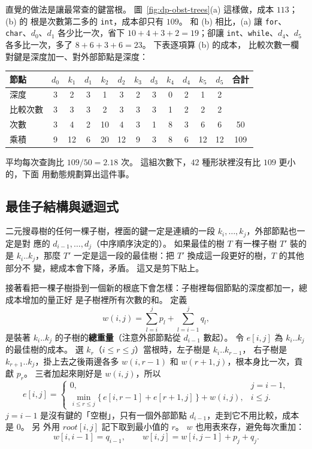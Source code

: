 直覺的做法是讓最常查的鍵當根。 圖~\ref{fig:dp-obst-trees}(a) 這樣做，成本 $113$；(b) 的
根是次數第二多的 \texttt{int}，成本卻只有 $109$。 和 (b) 相比，(a) 讓 \texttt{for}、\texttt{char}、$d_0$、$d_1$ 各少比一次，省下
$10 + 4 + 3 + 2 = 19$；卻讓 \texttt{int}、\texttt{while}、$d_4$、$d_5$ 各多比一次，多了
$8 + 6 + 3 + 6 = 23$。 下表逐項算 (b) 的成本，
比較次數一欄對鍵是深度加一、對外部節點是深度：

\begin{center}
\begin{tabular}{l*{11}{c}c}
\toprule
節點 & $d_0$ & $k_1$ & $d_1$ & $k_2$ & $d_2$ & $k_3$ & $d_3$ & $k_4$ & $d_4$ & $k_5$ & $d_5$ & 合計 \\
\midrule
深度 & 3 & 2 & 3 & 1 & 3 & 2 & 3 & 0 & 2 & 1 & 2 & \\
比較次數 & 3 & 3 & 3 & 2 & 3 & 3 & 3 & 1 & 2 & 2 & 2 & \\
次數 & 3 & 4 & 2 & 10 & 4 & 3 & 1 & 8 & 3 & 6 & 6 & 50 \\
乘積 & 9 & 12 & 6 & 20 & 12 & 9 & 3 & 8 & 6 & 12 & 12 & 109 \\
\bottomrule
\end{tabular}
\end{center}

平均每次查詢比 $109 / 50 = 2.18$ 次。 這組次數下，$42$ 種形狀裡沒有比 $109$ 更小的，下面
用動態規劃算出這件事。

\subsection{最佳子結構與遞迴式}

二元搜尋樹的任何一棵子樹，裡面的鍵一定是連續的一段 $k_i, \ldots, k_j$，外部節點也一定是對
應的 $d_{i-1}, \ldots, d_j$（中序順序決定的）。 如果最佳的樹 $T$ 有一棵子樹 $T'$ 裝的是
$k_i..k_j$，那麼 $T'$ 一定是這一段的最佳樹：把 $T'$ 換成這一段更好的樹，$T$ 的其他部分不
變，總成本會下降，矛盾。 這又是剪下貼上。

接著看把一棵子樹掛到一個新的根底下會怎樣：子樹裡每個節點的深度都加一，總成本增加的量正好
是子樹裡所有次數的和。 定義
\[
w(i, j) = \sum_{l=i}^{j} p_l + \sum_{l=i-1}^{j} q_l ,
\]
是裝著 $k_i..k_j$ 的子樹的\textbf{總重量}（注意外部節點從 $d_{i-1}$ 數起）。 令 $e[i, j]$
為 $k_i..k_j$ 的最佳樹的成本。 選 $k_r$（$i \le r \le j$）當根時，左子樹是 $k_i..k_{r-1}$，
右子樹是 $k_{r+1}..k_j$，掛上去之後兩邊各多 $w(i, r-1)$ 和 $w(r+1, j)$，根本身比一次，貢獻
$p_r$。 三者加起來剛好是 $w(i, j)$，所以
\[
e[i, j] = \begin{cases}
0, & j = i - 1, \\[2pt]
\displaystyle\min_{i \le r \le j} \bigl\{\, e[i, r-1] + e[r+1, j] \,\bigr\} + w(i, j), & i \le j .
\end{cases}
\]
$j = i - 1$ 是沒有鍵的「空樹」，只有一個外部節點 $d_{i-1}$，走到它不用比較，成本是 $0$。 另
外用 $\mathit{root}[i, j]$ 記下取到最小值的 $r$。 $w$ 也用表來存，避免每次重加：
\[
w[i, i - 1] = q_{i-1}, \qquad w[i, j] = w[i, j - 1] + p_j + q_j .
\]

